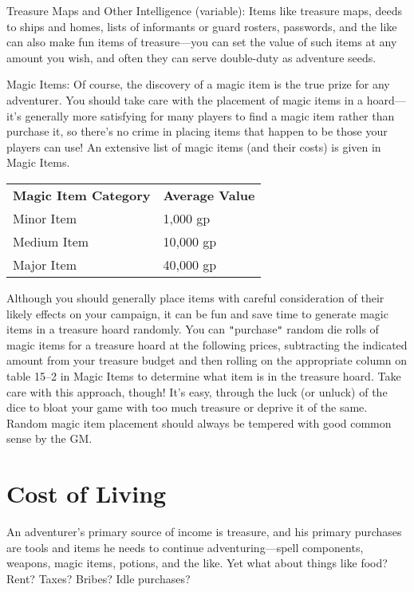 Treasure Maps and Other Intelligence (variable): Items like treasure maps, deeds to ships and homes, lists of informants or guard rosters, passwords, and the like can also make fun items of treasure---you can set the value of such items at any amount you wish, and often they can serve double-duty as adventure seeds.
				
Magic Items: Of course, the discovery of a magic item is the true prize for any adventurer. You should take care with the placement of magic items in a hoard---it's generally more satisfying for many players to find a magic item rather than purchase it, so there's no crime in placing items that happen to be those your players can use! An extensive list of magic items (and their costs) is given in Magic Items.
				
\begin{tabular}{ll}
\textbf{Magic Item Category} & \textbf{Average Value}\\
Minor Item & 1,000 gp\\
Medium Item & 10,000 gp\\
Major Item & 40,000 gp \\
\end{tabular}

				
Although you should generally place items with careful consideration of their likely effects on your campaign, it can be fun and save time to generate magic items in a treasure hoard randomly. You can \texttt{{}"{}}purchase\texttt{{}"{}} random die rolls of magic items for a treasure hoard at the following prices, subtracting the indicated amount from your treasure budget and then rolling on the appropriate column on table 15--2 in Magic Items to determine what item is in the treasure hoard. Take care with this approach, though! It's easy, through the luck (or unluck) of the dice to bloat your game with too much treasure or deprive it of the same. Random magic item placement should always be tempered with good common sense by the GM.
								
\section{Cost of Living}

				
An adventurer's primary source of income is treasure, and his primary purchases are tools and items he needs to continue adventuring---spell components, weapons, magic items, potions, and the like. Yet what about things like food? Rent? Taxes? Bribes? Idle purchases?
				
